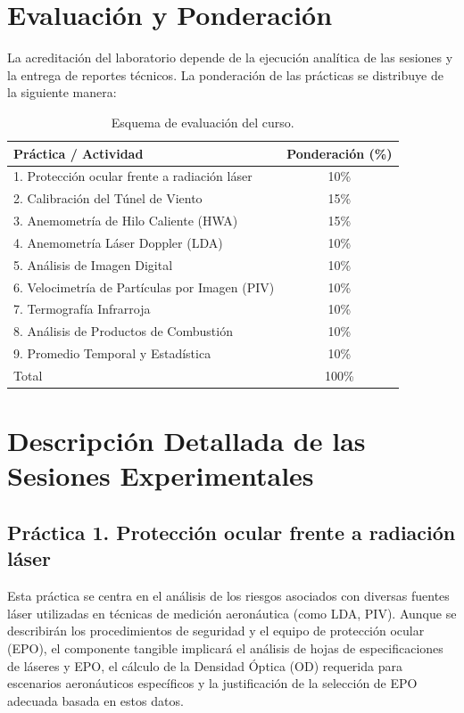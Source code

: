 \documentclass[11pt, a4paper]{article}
\begin{document}
\section{Evaluación y Ponderación}
La acreditación del laboratorio depende de la ejecución analítica de las sesiones y la entrega de reportes técnicos. La ponderación de las prácticas se distribuye de la siguiente manera:

\begin{table}[htbp]
    \centering
    \begin{tabular}{lc}
        \toprule
        Práctica / Actividad & Ponderación (\%) \\
        \midrule
        1. Protección ocular frente a radiación láser & 10\% \\
        2. Calibración del Túnel de Viento & 15\% \\
        3. Anemometría de Hilo Caliente (HWA) & 15\% \\
        4. Anemometría Láser Doppler (LDA) & 10\% \\
        5. Análisis de Imagen Digital & 10\% \\
        6. Velocimetría de Partículas por Imagen (PIV) & 10\% \\
        7. Termografía Infrarroja & 10\% \\
        8. Análisis de Productos de Combustión & 10\% \\
        9. Promedio Temporal y Estadística & 10\% \\
        \midrule
        Total & 100\% \\
        \bottomrule
    \end{tabular}
    \caption{Esquema de evaluación del curso.}
\end{table}

\newpage
\section{Descripción Detallada de las Sesiones Experimentales}

\subsection{Práctica 1. Protección ocular frente a radiación láser}
Esta práctica se centra en el análisis de los riesgos asociados con diversas fuentes láser utilizadas en técnicas de medición aeronáutica (como LDA, PIV). Aunque se describirán los procedimientos de seguridad y el equipo de protección ocular (EPO), el componente tangible implicará el análisis de hojas de especificaciones de láseres y EPO, el cálculo de la Densidad Óptica (OD) requerida para escenarios aeronáuticos específicos y la justificación de la selección de EPO adecuada basada en estos datos.
\end{document}
